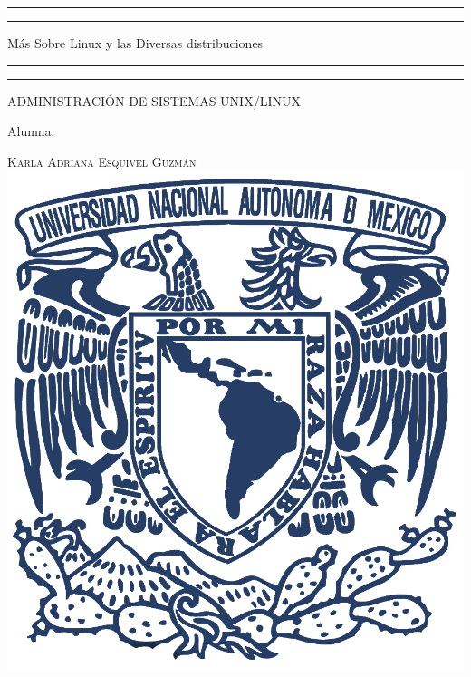 \documentclass[a4paper, 11pt, oneside]{article}
\begin{document}
 

\begin{titlepage} 

	\centering 
	
	\scshape 
	
	\vspace*{\baselineskip} 
	
	
	
	\rule{\textwidth}{1.6pt}\vspace*{-\baselineskip}\vspace*{2pt} 
	\rule{\textwidth}{0.4pt} 
	
	\vspace{0.75\baselineskip} 
	
	{\LARGE Más Sobre Linux y las Diversas distribuciones}	
	\vspace{0.75\baselineskip} 
	
	\rule{\textwidth}{0.4pt}\vspace*{-\baselineskip}\vspace{3.2pt}
	\rule{\textwidth}{1.6pt} 
	
	\vspace{2\baselineskip} 
	

	ADMINISTRACIÓN DE SISTEMAS UNIX/LINUX
	
	\vspace*{3\baselineskip} 
	
	
	
	Alumna:
	
	\vspace{0.5\baselineskip} 
	
	{\scshape\Large Karla Adriana Esquivel Guzmán \\} 
	\vspace{0.5\baselineskip} 
	\vfill
	\includegraphics{unam.jpg}
	

\end{titlepage}
\end{document}
